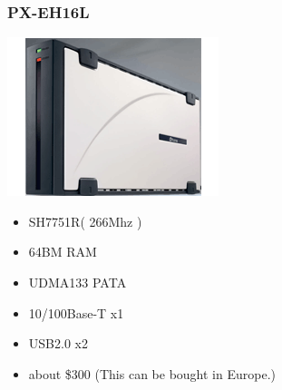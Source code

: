 \documentclass[cjk,dvipdfm,12pt]{beamer}
\begin{document}
\begin{frame}
 \frametitle{PX-EH16L}
 \begin{minipage}[t]{0.4\hsize}
  \includegraphics[width=1.0\hsize]{image200705/PX-EH16L.png}
 \end{minipage} 
 \begin{minipage}[t]{0.5\hsize}
  \begin{itemize}
   \item SH7751R( 266Mhz )
   \item 64BM RAM
   \item UDMA133 PATA 
   \item 10/100Base-T x1
   \item USB2.0 x2 
   \item about \$300 (This can be bought in Europe.)
  \end{itemize}
 \end{minipage}
\end{frame}


\end{document}
